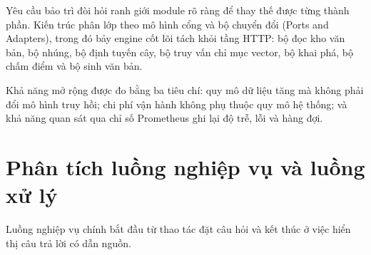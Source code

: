 Yêu cầu bảo trì đòi hỏi ranh giới module rõ ràng để thay thế được từng thành phần. Kiến trúc phân lớp theo mô hình cổng và bộ chuyển đổi (Ports and Adapters), trong đó bảy engine cốt lõi tách khỏi tầng HTTP: bộ đọc kho văn bản, bộ nhúng, bộ định tuyến cây, bộ truy vấn chỉ mục vector, bộ khai phá, bộ chấm điểm và bộ sinh văn bản.

Khả năng mở rộng được đo bằng ba tiêu chí: quy mô dữ liệu tăng mà không phải đổi mô hình truy hồi; chi phí vận hành không phụ thuộc quy mô hệ thống; và khả năng quan sát qua chỉ số Prometheus ghi lại độ trễ, lỗi và hàng đợi.

\section{Phân tích luồng nghiệp vụ và luồng xử lý}
\label{sec:luong-nghiep-vu}

Luồng nghiệp vụ chính bắt đầu từ thao tác đặt câu hỏi và kết thúc ở việc hiển thị câu trả lời có dẫn nguồn.

